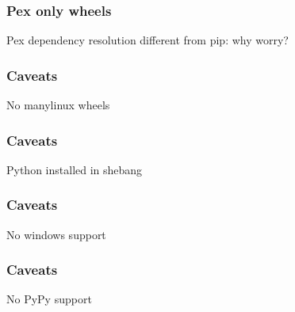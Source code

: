 \begin{frame}[fragile]
\frametitle{Pex only wheels}
Pex dependency resolution different from pip:
why worry?
\end{frame}

\begin{frame}[fragile]
\frametitle{Caveats}
No manylinux wheels
\end{frame}

\begin{frame}[fragile]
\frametitle{Caveats}
Python installed in shebang
\end{frame}

\begin{frame}[fragile]
\frametitle{Caveats}
No windows support
\end{frame}

\begin{frame}[fragile]
\frametitle{Caveats}
No PyPy support
\end{frame}



